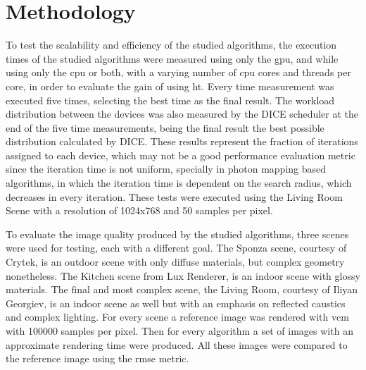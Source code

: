 


\section{Methodology}

To test the scalability and efficiency of the studied algorithms, the execution times of the studied algorithms were measured using only the \gls{gpu}, and while using only the \gls{cpu} or both, with a varying number of \gls{cpu} cores and threads per core, in order to evaluate the gain of using \gls{ht}. Every time measurement was executed five times, selecting the best time as the final result. The workload distribution between the devices was also measured by the DICE scheduler at the end of the five time measurements, being the final result the best possible distribution calculated by DICE. These results represent the fraction of iterations assigned to each device, which may not be a good performance evaluation metric since the iteration time is not uniform, specially in photon mapping based algorithms, in which the iteration time is dependent on the search radius, which decreases in every iteration. These tests were executed using the Living Room Scene with a resolution of 1024x768 and 50 samples per pixel.

To evaluate the image quality produced by the studied algorithms, three scenes were used for testing, each with a different goal. The Sponza scene, courtesy of Crytek, is an outdoor scene with only diffuse materials, but complex geometry nonetheless. The Kitchen scene from Lux Renderer, is an indoor scene with glossy materials. The final and most complex scene, the Living Room, courtesy of Iliyan Georgiev, is an indoor scene as well but with an emphasis on reflected caustics and complex lighting. For every scene a reference image was rendered with \gls{vcm} with 100000 samples per pixel. Then for every algorithm a set of images with an approximate rendering time were produced. All these images were compared to the reference image using the \gls{rmse} metric.


